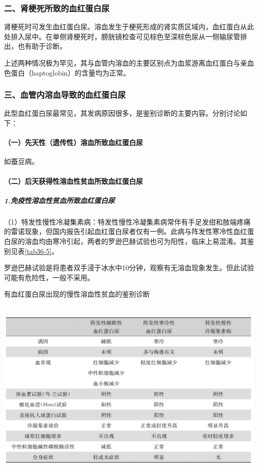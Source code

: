 \subsubsection{二、肾梗死所致的血红蛋白尿}

肾梗死时可发生血红蛋白尿。溶血发生于梗死形成的肾实质区域内，血红蛋白从此处排入尿中。在单侧肾梗死时，膀胱镜检查可见棕色至深棕色尿从一侧输尿管排出，也有助于诊断。

上述两种情况极为罕见，其与血管内溶血的主要区别点为血浆游离血红蛋白与亲血色蛋白（haptoglobin）的含量均为正常。

\subsubsection{三、血管内溶血导致的血红蛋白尿}

此型血红蛋白尿最常见，其发病原因很多，是鉴别诊断的主要内容。分别讨论如下：

\paragraph{（一）先天性（遗传性）溶血所致血红蛋白尿}

如蚕豆病。

\paragraph{（二）后天获得性溶血性贫血所致血红蛋白尿}

\subparagraph{1.免疫性溶血性贫血所致血红蛋白尿}

（1）特发性慢性冷凝集素病：特发性慢性冷凝集素病常伴有手足发绀和肢端疼痛的雷诺现象，但国内报告引起血红蛋白尿者仅有一例。此病与阵发性寒冷性血红蛋白尿的溶血均由寒冷引起，两者的罗逊巴赫试验也可为阳性，临床上易混淆。其鉴别见表\ref{tab36-5}。

罗逊巴赫试验是将患者双手浸于冰水中10分钟，观察有无溶血现象发生。但此试验可能有危险性，一般不采用。

\begin{table}[htbp]
\centering
\caption{有血红蛋白尿出现的慢性溶血性贫血的鉴别诊断}
\label{tab36-5}
\includegraphics[width=5.9375in,height=3.54167in]{./images/Image00228.jpg}
\end{table}

